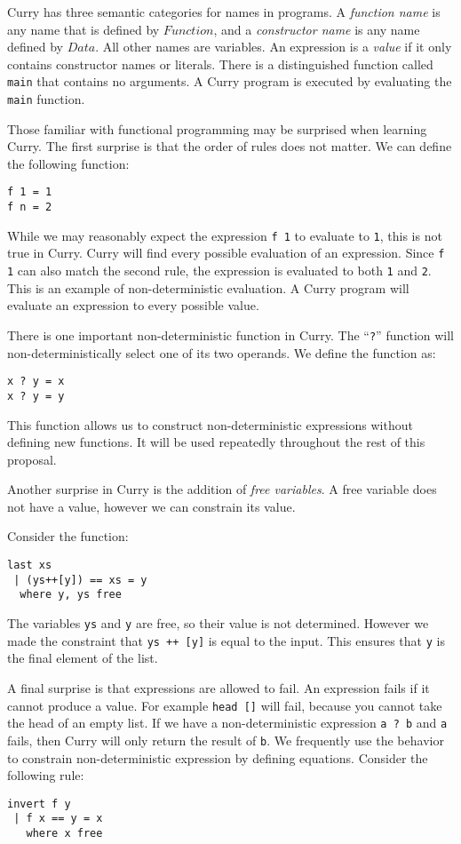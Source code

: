 Curry has three semantic categories for names in programs.
A \textit{function name} is any name that is defined by $Function$, and a \textit{constructor name}
is any name defined by $Data$.  All other names are variables.
An expression is a \textit{value} if it only contains constructor names or literals.
There is a distinguished function called \texttt{main} that contains no arguments.
A Curry program is executed by evaluating the \texttt{main} function.

Those familiar with functional programming may be surprised when learning Curry.
The first surprise is that the order of rules does not matter.
We can define the following function:
\begin{verbatim}
f 1 = 1
f n = 2
\end{verbatim}

While we may reasonably expect the expression \texttt{f 1} to evaluate to \texttt 1, this is not true in Curry.
Curry will find every possible evaluation of an expression.
Since \texttt{f 1} can also match the second rule, the expression is evaluated to both \texttt 1 and \texttt 2.
This is an example of non-deterministic evaluation.
A Curry program will evaluate an expression to every possible value.

There is one important non-deterministic function in Curry.
The ``\texttt{?}'' function will non-deterministically select one of its two operands.
We define the function as:

\begin{verbatim}
x ? y = x
x ? y = y
\end{verbatim}

This function allows us to construct non-deterministic expressions without defining new functions.
It will be used repeatedly throughout the rest of this proposal.

Another surprise in Curry is the addition of \textit{free variables}.
A free variable does not have a value, however we can constrain its value.

Consider the function:
\begin{verbatim}
last xs
 | (ys++[y]) == xs = y
  where y, ys free
\end{verbatim}

The variables \texttt{ys} and \texttt y are free, so their value is not determined.
However we made the constraint that \texttt{ys ++ [y]} is equal to the input.
This ensures that \texttt y is the final element of the list.

A final surprise is that expressions are allowed to fail.
An expression fails if it cannot produce a value.
For example \texttt{head []} will fail, because you cannot take the head of an empty list.
If we have a non-deterministic expression \texttt{a ? b} and \texttt a fails, then Curry will only return the result of \texttt b.
We frequently use the behavior to constrain non-deterministic expression by defining equations.
Consider the following rule:
\begin{verbatim}
invert f y
 | f x == y = x
   where x free
\end{verbatim}

